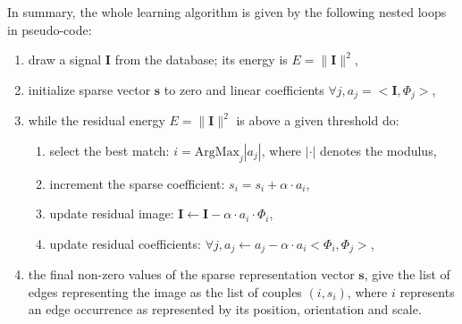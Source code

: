 \documentclass{article}
\begin{document}
In summary, the whole learning algorithm is given by the following nested loops
in pseudo-code:
\begin{enumerate}
\item draw a signal $\mathbf{I}$ from the database; its energy is $E = \| \mathbf{I} \|^2$,
\item initialize sparse vector $\mathbf{s}$ to zero and linear coefficients $\forall j, {a}_j=<\mathbf{I}, \Phi_j >$,
\item while the residual energy $E = \| \mathbf{I} \|^2$ is above a given threshold do:
\begin{enumerate}
\item select the best match: $i = \mbox{ArgMax}_{j} | {a}_j |$, where $| \cdot |$ denotes the modulus,
\item increment the sparse coefficient: $s_{i} = s_{i} + \alpha \cdot {a}_{i}$,
\item update residual image: $ \mathbf{I} \leftarrow \mathbf{I} - \alpha \cdot a_{i} \cdot \Phi_{i} $,
\item update residual coefficients: $\forall j, {a}_j \leftarrow {a}_j - \alpha \cdot a_{i} <\Phi_{i} , \Phi_j > $,
\end{enumerate}
\item the final non-zero values of the sparse representation vector
$\mathbf{s}$, give the list of edges representing the
image as the list of couples $(i, s_{i})$, where $i$ represents an edge occurrence
as represented by its position, orientation and scale.
\end{enumerate}
\end{document}
